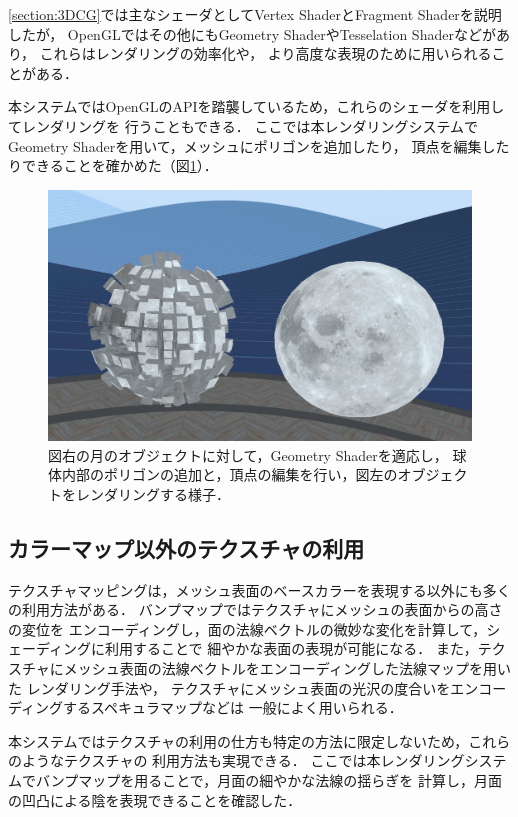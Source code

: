 \ref{section:3DCG}では主なシェーダとしてVertex ShaderとFragment Shaderを説明したが，
OpenGLではその他にもGeometry ShaderやTesselation Shaderなどがあり，
これらはレンダリングの効率化\cite{geometry-shader-research1}や，
より高度な表現\cite{geometry-shader-research2}のために用いられることがある．


本システムではOpenGLのAPIを踏襲しているため，これらのシェーダを利用してレンダリングを
行うこともできる．
ここでは本レンダリングシステムでGeometry Shaderを用いて，メッシュにポリゴンを追加したり，
頂点を編集したりできることを確かめた（図\ref{fig:geometry-shader}）．

\begin{figure}[htbp]
  \centering
  \includegraphics[keepaspectratio, width=0.7\linewidth]{figures/geometry-shader.jpg}
  \caption{
    図右の月のオブジェクトに対して，Geometry Shaderを適応し，
    球体内部のポリゴンの追加と，頂点の編集を行い，図左のオブジェクトをレンダリングする様子．
  }
  \label{fig:geometry-shader}
\end{figure}

\subsection{カラーマップ以外のテクスチャの利用}

テクスチャマッピングは，メッシュ表面のベースカラーを表現する以外にも多くの利用方法がある．
バンプマップ\cite{bump-mapping}ではテクスチャにメッシュの表面からの高さの変位を
エンコーディングし，面の法線ベクトルの微妙な変化を計算して，シェーディングに利用することで
細やかな表面の表現が可能になる．
また，テクスチャにメッシュ表面の法線ベクトルをエンコーディングした法線マップを用いた
レンダリング手法\cite{normal-map}や，
テクスチャにメッシュ表面の光沢の度合いをエンコーディングするスペキュラマップなどは
一般によく用いられる．

本システムではテクスチャの利用の仕方も特定の方法に限定しないため，これらのようなテクスチャの
利用方法も実現できる．
ここでは本レンダリングシステムでバンプマップを用ることで，月面の細やかな法線の揺らぎを
計算し，月面の凹凸による陰を表現できることを確認した．

